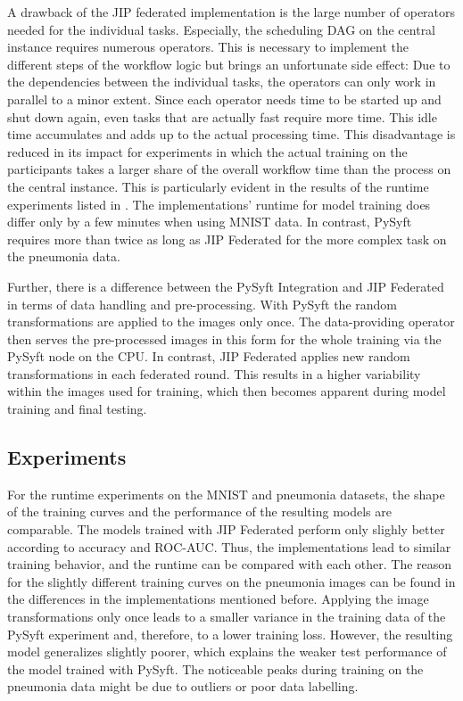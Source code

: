 A drawback of the JIP federated implementation is the large number of operators needed for the individual tasks.
Especially, the scheduling DAG on the central instance requires numerous operators. This is necessary to implement the different steps of the workflow logic but brings an unfortunate side effect: Due to the dependencies between the individual tasks, the operators can only work in parallel to a minor extent.
Since each operator needs time to be started up and shut down again, even tasks that are actually fast require more time.
This idle time accumulates and adds up to the actual processing time. This disadvantage is reduced in its impact for experiments in which the actual training on the participants takes a larger share of the overall workflow time than the process on the central instance.
This is particularly evident in the results of the runtime experiments listed in .
The implementations' runtime for model training does differ only by a few minutes when using MNIST data. In contrast, PySyft requires more than twice as long as JIP Federated for the more complex task on the pneumonia data.

Further, there is a difference between the PySyft Integration and JIP Federated in terms of data handling and pre-processing.
With PySyft the random transformations are applied to the images only once. The data-providing operator then serves the pre-processed images in this form for the whole training via the PySyft node on the CPU. In contrast, JIP Federated applies new random transformations in each federated round. This results in a higher variability within the images used for training,
which then becomes apparent during model training and final testing.






\subsection{Experiments}
\label{subsec:DiscussionExperiments}

For the runtime experiments on the MNIST and pneumonia datasets,
the shape of the training curves and the performance of the resulting models are comparable. The models trained with JIP Federated perform only slighly better according to accuracy and ROC-AUC. Thus, the implementations lead to similar training behavior, and the runtime can be compared with each other.
The reason for the slightly different training curves on the pneumonia images can be found in the differences in the implementations mentioned before.
Applying the image transformations only once leads to a smaller variance in the training data of the PySyft experiment and, therefore, to a lower training loss. However, the resulting model generalizes slightly poorer, which explains the weaker test performance of the model trained with PySyft.
The noticeable peaks during training on the pneumonia data might be due to outliers or poor data labelling.

